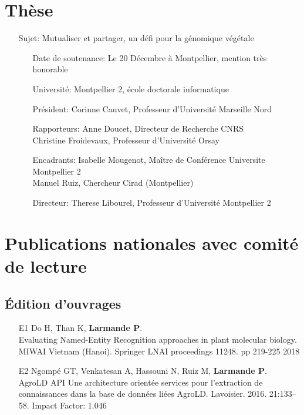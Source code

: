 \section*{Thèse}
\begin{itemize}
\item[Sujet:] Mutualiser et partager, un défi pour la génomique végétale
\begin{itemize}

\item[Date de soutenance:] Le 20 Décembre à Montpellier, mention très honorable
\item[Université:] Montpellier 2, école doctorale informatique
\item[Président:] Corinne Cauvet, Professeur d'Université Marseille Nord
\item[Rapporteurs:] Anne Doucet, Directeur de Recherche CNRS\\
                    \hspace{20mm}Christine Froidevaux, Professeur d'Université Orsay
\item[Encadrants:] Isabelle Mougenot, Maître de Conférence Universite Montpellier 2\\
                    \hspace{20mm}Manuel Ruiz, Chercheur Cirad (Montpellier)
\item[Directeur:] Therese Libourel, Professeur d'Université Montpellier 2
    \end{itemize}
\end{itemize}
\section*{Publications nationales avec comité de lecture}
\subsection*{Édition d’ouvrages} 
\begin{itemize}
\item [E1] Do H, Than K, \textbf{Larmande P}.\\ Evaluating Named-Entity Recognition approaches in plant molecular biology. MIWAI Vietnam (Hanoi). Springer LNAI  proceedings 11248. pp 219-225 2018
\item [E2]	Ngompé GT, Venkatesan A, Hassouni N, Ruiz M, \textbf{Larmande P}.\\ AgroLD API Une architecture orientée services pour l’extraction de connaissances dans la base de données liées AgroLD. Lavoisier. 2016. 21:133–58. Impact Factor: 1.046
\end{itemize}

